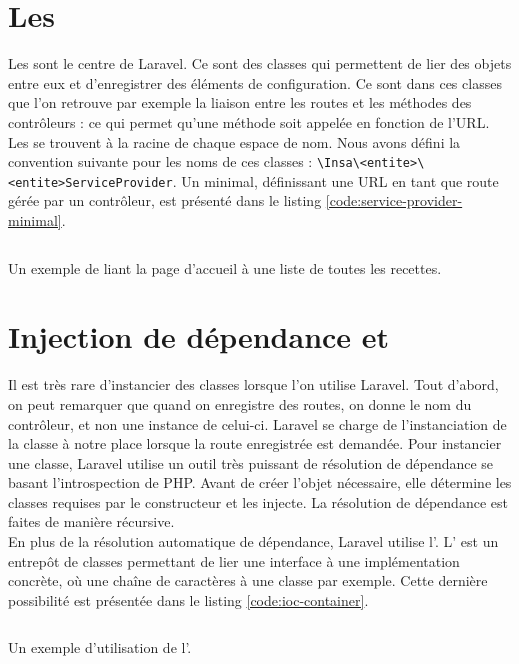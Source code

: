 \section{Les \servicesProvider{}}
	Les \servicesProvider{} sont le centre de Laravel. Ce sont des classes qui permettent de lier des objets entre eux et d'enregistrer des éléments de configuration. Ce sont dans ces classes que l'on retrouve par exemple la liaison entre les routes et les méthodes des contrôleurs : ce qui permet qu'une méthode soit appelée en fonction de l'URL.\\

	Les \servicesProvider{} se trouvent à la racine de chaque espace de nom. Nous avons défini la convention suivante pour les noms de ces classes : \verb|\Insa\<entite>\<entite>ServiceProvider|. Un \serviceProvider{} minimal, définissant une URL en tant que route gérée par un contrôleur, est présenté dans le listing \ref{code:service-provider-minimal}.
	\begin{listing}[H]
		\inputminted{php}{code/serviceProvider.php}
		\caption{Un exemple de \serviceProvider{} liant la page d'accueil à une liste de toutes les recettes.}
		\label{code:service-provider-minimal}
	\end{listing}

\section{Injection de dépendance et \ioc{}}
\label{sec:ioc}
	Il est très rare d'instancier des classes lorsque l'on utilise Laravel. Tout d'abord, on peut remarquer que quand on enregistre des routes, on donne le nom du contrôleur, et non une instance de celui-ci. Laravel se charge de l'instanciation de la classe à notre place lorsque la route enregistrée est demandée. Pour instancier une classe, Laravel utilise un outil très puissant de résolution de dépendance se basant l'introspection de PHP. Avant de créer l'objet nécessaire, elle détermine les classes requises par le constructeur et les injecte. La résolution de dépendance est faites de manière récursive.\\

	En plus de la résolution automatique de dépendance, Laravel utilise l'\ioc{}. L'\ioc{} est un entrepôt de classes permettant de lier une interface à une implémentation concrète, où une chaîne de caractères à une classe par exemple. Cette dernière possibilité est présentée dans le listing \ref{code:ioc-container}.

	\begin{listing}[H]
		\inputminted{php}{code/iocContainer.php}
		\caption{Un exemple d'utilisation de l'\ioc{}.}
		\label{code:ioc-container}
	\end{listing}

